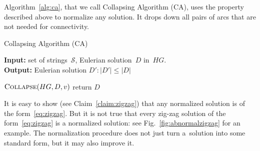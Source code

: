 Algorithm~\ref{alg:ca}, that we call Collapsing Algorithm (CA), uses the property described above to normalize any solution.
It drops down all pairs of arcs that are not needed for connectivity.



\begin{algorithm}[!ht]
\caption{Collapsing Algorithm (CA)}
\label{alg:ca}
\hspace*{\algorithmicindent} \textbf{Input:} set of strings~$\mathcal{S}$, Eulerian solution~$D$ in~$HG$.\\
\hspace*{\algorithmicindent} \textbf{Output:} Eulerian solution $D'\colon |D'|\leq|D|$
\begin{algorithmic}[1]
\label{alg:ca_for}
\State $\text{\sc Collapse}(HG, D, v)$
\EndWhile
\EndFor
\EndFor
\State return $D$
\end{algorithmic}
\end{algorithm}

It is easy to show (see Claim~\ref{claim:zigzag}) that any normalized solution is of the form~\eqref{eq:zigzag}. But it is not true that every zig-zag solution of the form~\eqref{eq:zigzag} is a normalized solution: see Fig.~\ref{fig:abnormalzigzag} for an example. The normalization procedure does not just turn a~solution into some standard form, but it may also improve it.

